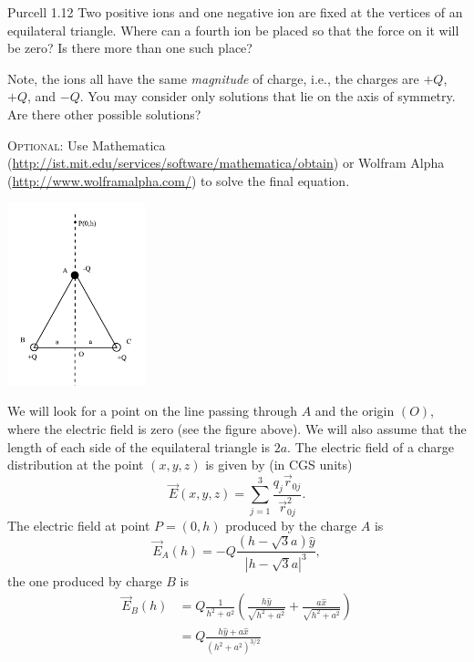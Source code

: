 \documentclass{esg8022pset}
\begin{document}
\begin{problem}{Purcell 1.12}
  Two positive ions and one negative ion are fixed at the vertices of an equilateral triangle.  Where can a fourth ion be placed so that the force on it will be zero?  Is there more than one such place?
  
  Note, the ions all have the same \emph{magnitude} of charge, i.e., the charges are $+Q$, $+Q$, and $-Q$. You may consider only solutions that lie on the axis of symmetry. Are there other possible solutions?
  
  \textsc{Optional}: Use Mathematica (\url{http://ist.mit.edu/services/software/mathematica/obtain}) or Wolfram Alpha (\url{http://www.wolframalpha.com/}) to solve the final equation.
\end{problem}
\begin{solution}
  \begin{center}\includegraphics[width=0.3\textwidth]{ps01_sol_06}\end{center}
  We will look for a point on the line passing through $A$ and the origin $(O)$, where the electric field is zero (see the figure above). We will also assume that the length of each side of the equilateral triangle is $2a$. The electric field of a charge distribution at the point $(x, y, z)$ is given by (in CGS units)
  \begin{equation*}
    \vec E(x,y,z) = \sum_{j = 1}^3 \frac{q_j \vec r_{0j}}{\vec r_{0j}^2}.
  \end{equation*}
  The electric field at point $P = (0, h)$ produced by the charge $A$ is
  \begin{equation*}
    \vec E_A(h) = -Q\frac{(h - \sqrt3 a)\hat y}{|h - \sqrt3 a|^3},
  \end{equation*}
  the one produced by charge $B$ is 
  \begin{align*}
    \vec E_B(h) & = Q\frac{1}{h^2 + a^2} \left(\frac{h\hat y}{\sqrt{h^2 + a^2}} + \frac{a\hat x}{\sqrt{h^2 + a^2}}\right) \\
                & = Q\frac{h\hat y + a\hat x}{(h^2 + a^2)^{3/2}}

\end{align*}
\end{solution}
\end{document}
